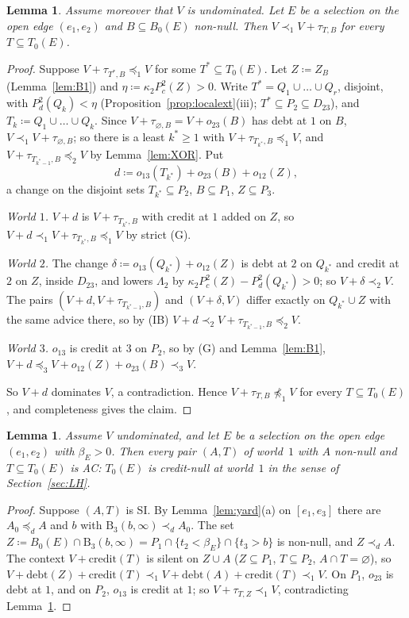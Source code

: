 \documentclass[11pt]{article}
\newtheorem{lemma}[theorem]{Lemma}
\theoremstyle{definition}\newtheorem{definition}[theorem]{Definition}
\theoremstyle{remark}\newtheorem{remark}[theorem]{Remark}
\newcommand{\debt}{\mathrm{debt}}
\newcommand{\cred}{\mathrm{credit}}
\newcommand{\Band}{\mathrm{B}}
\begin{document}
\begin{lemma}\label{lem:B2}
Assume moreover that $V$ is undominated. Let $E$ be a selection on the open
edge $(e_1,e_2)$ and $B\subseteq B_0(E)$ non-null. Then
$V\prec_1V+\tau_{T,B}$ for every $T\subseteq T_0(E)$.
\end{lemma}
\begin{proof}
Suppose $V+\tau_{T^*,B}\preceq_1V$ for some $T^*\subseteq T_0(E)$. Let
$Z\coloneqq Z_B$ (Lemma~\ref{lem:B1}) and $\eta\coloneqq\kappa_2P^2_c(Z)>0$.
Write $T^*=Q_1\cup\dots\cup Q_r$, disjoint, with $P^2_d(Q_k)<\eta$
(Proposition~\ref{prop:localext}(iii); $T^*\subseteq P_2\subseteq D_{23}$),
and $T_k\coloneqq Q_1\cup\dots\cup Q_k$. Since $V+\tau_{\varnothing,B}=
V+o_{23}(B)$ has debt at $1$ on $B$, $V\prec_1V+\tau_{\varnothing,B}$; so
there is a least $k^*\ge1$ with $V+\tau_{T_{k^*},B}\preceq_1V$, and
$V+\tau_{T_{k^*-1},B}\preceq_2V$ by Lemma~\ref{lem:XOR}. Put
\[
 d\coloneqq o_{13}(T_{k^*})+o_{23}(B)+o_{12}(Z),
\]
a change on the disjoint sets $T_{k^*}\subseteq P_2$, $B\subseteq P_1$,
$Z\subseteq P_3$.

\emph{World $1$.} $V+d$ is $V+\tau_{T_{k^*},B}$ with credit at $1$ added on
$Z$, so $V+d\prec_1V+\tau_{T_{k^*},B}\preceq_1V$ by strict (G).

\emph{World $2$.} The change $\delta\coloneqq o_{13}(Q_{k^*})+o_{12}(Z)$ is
debt at $2$ on $Q_{k^*}$ and credit at $2$ on $Z$, inside $D_{23}$, and
lowers $\Lambda_2$ by $\kappa_2P^2_c(Z)-P^2_d(Q_{k^*})>0$; so
$V+\delta\prec_2V$. The pairs $(V+d,V+\tau_{T_{k^*-1},B})$ and $(V+\delta,V)$
differ exactly on $Q_{k^*}\cup Z$ with the same advice there, so by (IB)
$V+d\prec_2V+\tau_{T_{k^*-1},B}\preceq_2V$.

\emph{World $3$.} $o_{13}$ is credit at $3$ on $P_2$, so by (G) and
Lemma~\ref{lem:B1}, $V+d\preceq_3V+o_{12}(Z)+o_{23}(B)\prec_3V$.

So $V+d$ dominates $V$, a contradiction. Hence $V+\tau_{T,B}\not\preceq_1V$
for every $T\subseteq T_0(E)$, and completeness gives the claim.
\end{proof}

\begin{lemma}\label{lem:B3}
Assume $V$ undominated, and let $E$ be a selection on the open edge
$(e_1,e_2)$ with $\beta_E>0$. Then every pair $(A,T)$ of world~$1$ with $A$
non-null and $T\subseteq T_0(E)$ is AC: $T_0(E)$ is credit-null at world~$1$
in the sense of Section~\ref{sec:LH}.
\end{lemma}
\begin{proof}
Suppose $(A,T)$ is SI. By Lemma~\ref{lem:yard}(a) on $[e_1,e_3]$ there are
$A_0\preceq_dA$ and $b$ with $\Band_3(b,\infty)\prec_dA_0$. The set
$Z\coloneqq B_0(E)\cap\Band_3(b,\infty)=P_1\cap\{t_2<\beta_E\}\cap\{t_3>b\}$
is non-null, and $Z\prec_dA$. The context $V+\cred(T)$ is silent on $Z\cup A$
($Z\subseteq P_1$, $T\subseteq P_2$, $A\cap T=\varnothing$), so
$V+\debt(Z)+\cred(T)\prec_1V+\debt(A)+\cred(T)\prec_1V$. On $P_1$, $o_{23}$ is
debt at $1$, and on $P_2$, $o_{13}$ is credit at $1$; so
$V+\tau_{T,Z}\prec_1V$, contradicting Lemma~\ref{lem:B2}.
\end{proof}
\end{document}

